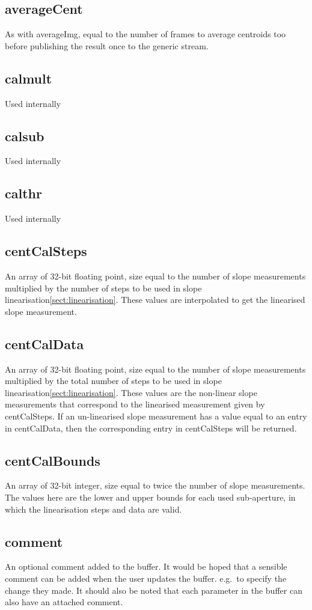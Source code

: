 \documentclass[a4,10pt]{article}
\begin{document}
\subsection{averageCent}
As with averageImg, equal to the number of frames to average centroids
too before publishing the result once to the generic stream.

\subsection{calmult}
Used internally
\subsection{calsub}
Used internally
\subsection{calthr}
Used internally
\subsection{centCalSteps}
An array of 32-bit floating point, size equal to the number of slope
measurements multiplied by the number of steps to be used in slope
linearisation\ref{sect:linearisation}.  These values are interpolated
to get the linearised slope measurement.

\subsection{centCalData}
An array of 32-bit floating point, size equal to the number of slope
measurements multiplied by the total number of steps to be used in
slope linearisation\ref{sect:linearisation}.  These values are the
non-linear slope measurements that correspond to the linearised
measurement given by centCalSteps.  If an un-linearised slope
measurement has a value equal to an entry in centCalData, then the
corresponding entry in centCalSteps will be returned.

\subsection{centCalBounds}
An array of 32-bit integer, size equal to twice the number of slope
measurements.  The values here are the lower and upper bounds for each
used sub-aperture, in which the linearisation steps and data are valid.

\subsection{comment}
An optional comment added to the buffer.  It would be hoped that
a sensible comment can be added when the user updates the buffer.
e.g.\ to specify the change they made.  It should also be noted that
each parameter in the buffer can also have an attached comment.
\end{document}
